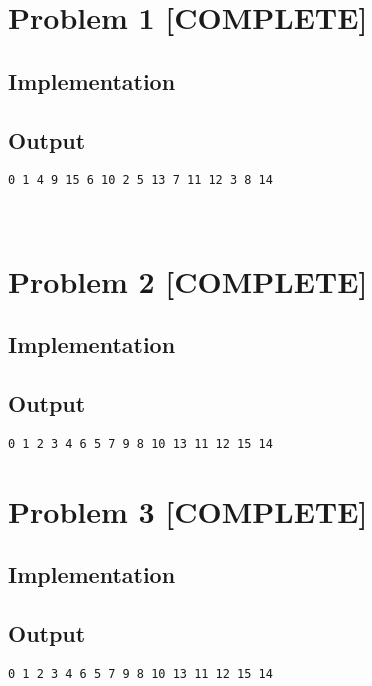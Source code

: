 \documentclass[6pt]{article}
\begin{document}
\pagebreak
\section*{Problem 1 [COMPLETE]}

\subsection*{Implementation}



\subsection*{Output}

\begin{lstlisting}
0 1 4 9 15 6 10 2 5 13 7 11 12 3 8 14
\end{lstlisting}
 \ \\
\section*{Problem 2 [COMPLETE]}

\subsection*{Implementation}



\subsection*{Output}

\begin{lstlisting}
0 1 2 3 4 6 5 7 9 8 10 13 11 12 15 14
\end{lstlisting}

\section*{Problem 3 [COMPLETE]}

\subsection*{Implementation}



\subsection*{Output}

\begin{lstlisting}
0 1 2 3 4 6 5 7 9 8 10 13 11 12 15 14
\end{lstlisting}
\end{document}

